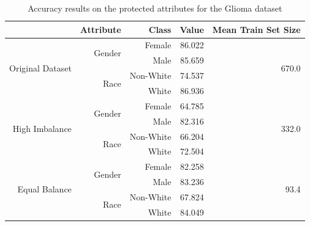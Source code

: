 \documentclass[12pt]{article}
\begin{document}
\begin{table}[]
  \centering
  \begin{tabular}{@{}rrrrr@{}}
  \toprule
                                    & Attribute               & Class     & Value  & Mean Train Set Size    \\ \midrule
  \multirow{4}{*}{Original Dataset} & \multirow{2}{*}{Gender} & Female    & 86.022 & \multirow{4}{*}{670.0} \\
                                    &                         & Male      & 85.659 &                        \\
                                    & \multirow{2}{*}{Race}   & Non-White & 74.537 &                        \\
                                    &                         & White     & 86.936 &                        \\ \midrule
  \multirow{4}{*}{High Imbalance}   & \multirow{2}{*}{Gender} & Female    & 64.785 & \multirow{4}{*}{332.0} \\
                                    &                         & Male      & 82.316 &                        \\
                                    & \multirow{2}{*}{Race}   & Non-White & 66.204 &                        \\
                                    &                         & White     & 72.504 &                        \\ \midrule
  \multirow{4}{*}{Equal Balance}    & \multirow{2}{*}{Gender} & Female    & 82.258 & \multirow{4}{*}{93.4}  \\
                                    &                         & Male      & 83.236 &                        \\
                                    & \multirow{2}{*}{Race}   & Non-White & 67.824 &                        \\
                                    &                         & White     & 84.049 &                        \\ \bottomrule
  \end{tabular}
  \caption{Accuracy results on the protected attributes for the Glioma dataset}
  \label{tab:acc-glioma}
\end{table}
\end{document}
